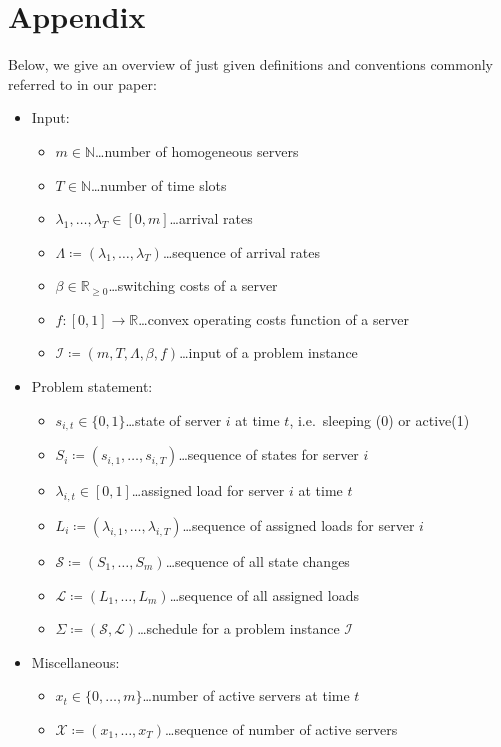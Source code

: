 \documentclass[hidelinks]{article}
\theoremstyle{plain}
\theoremstyle{definition}
\theoremstyle{rem}
\newcommand{\mx}{\mathcal{X}}
\newcommand{\inp}{\mathcal{I}}
\newcommand{\fromto}[2]{\{#1,\ldots,#2\}}
\begin{document}
\section*{Appendix}
Below, we give an overview of just given definitions and conventions commonly referred to in our paper:
\begin{itemize}
\item Input:
\begin{itemize}
	\item $m\in\mathbb{N}$\ldots number of homogeneous servers
	\item $T\in\mathbb{N}$\ldots number of time slots
	\item $\lambda_1,\ldots,\lambda_{T}\in[0,m]$\ldots arrival rates
	\item $\Lambda\coloneqq(\lambda_1,\ldots,\lambda_T)$\ldots sequence of arrival rates
	\item $\beta\in\mathbb{R}_{\ge 0}$\ldots switching costs of a server
	\item $f:[0,1]\rightarrow\mathbb{R}$\ldots convex operating costs function of a server
	\item $\inp\coloneqq(m,T,\Lambda,\beta,f)$\ldots input of a problem instance
\end{itemize}

\item Problem statement:
\begin{itemize}
	\item $s_{i,t}\in\{0,1\}$\ldots state of server $i$ at time $t$, i.e.\ sleeping (0) or active(1)
	\item $S_i\coloneqq(s_{i,1},\ldots,s_{i,T})$\ldots sequence of states for server $i$
	\item $\lambda_{i,t}\in[0,1]$\ldots assigned load for server $i$ at time $t$
	\item $L_i\coloneqq(\lambda_{i,1},\ldots,\lambda_{i,T})$\ldots sequence of assigned loads for server $i$
	\item $\mathcal{S}\coloneqq(S_1,\ldots,S_m)$\ldots sequence of all state changes
	\item $\mathcal{L}\coloneqq(L_1,\ldots,L_m)$\ldots sequence of all assigned loads
	\item $\Sigma\coloneqq(\mathcal{S},\mathcal{L})$\ldots schedule for a problem instance $\inp$
\end{itemize}

\item Miscellaneous:
\begin{itemize}
	\item $x_t\in\fromto{0}{m}$\ldots number of active servers at time $t$
	\item $\mx\coloneqq(x_1,\ldots,x_T)$\ldots sequence of number of active servers
\end{itemize}


\end{itemize}
\end{document}
